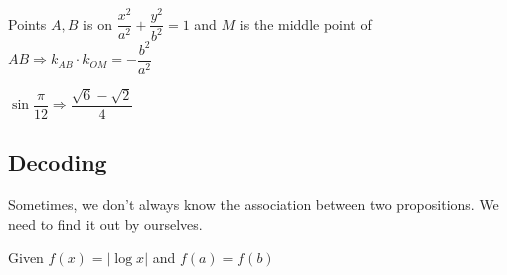 \begin{example}
  Points $A, B$ is on $\dfrac{x^2}{a^2} + \dfrac{y^2}{b^2} = 1$ and $M$ is the middle point of $AB \Rightarrow k_{AB} \cdot k_{OM} = -\dfrac{b^2}{a^2}$
\end{example}

\begin{example}
  $\sin{\dfrac{\pi}{12}} \Rightarrow \dfrac{\sqrt{6} -\sqrt{2}}{4}$
\end{example}




\subsection{Decoding}

Sometimes, we don't always know the association between two propositions. We need to find it out by ourselves.

\begin{example}
  Given $f(x) = |\log{x}|$ and $f(a) = f(b)$
\end{example}

